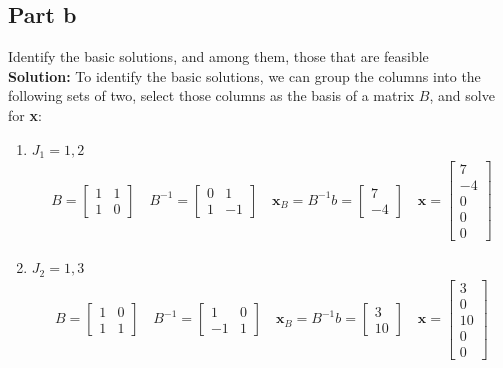 \documentclass[11pt]{article}
\begin{document}
\subsection{Part b}
Identify the basic solutions, and among them, those that are feasible
\\
\textbf{Solution: }
To identify the basic solutions, we can group the columns into the following sets of two, select those columns as the basis of a matrix $B$, and solve for \textbf{x}:
\begin{enumerate}
    \item $J_{1} = 1,2$
    \begin{align*}
      B = 
      \begin{bmatrix}
        1 & 1 \\ 1 & 0
      \end{bmatrix}
      \quad
      B^{-1} =
      \begin{bmatrix}
        0 & 1 \\ 1 & -1
      \end{bmatrix}
      \quad 
      \textbf{x}_{B} = B^{-1} b = 
      \begin{bmatrix}
        7 \\ -4
      \end{bmatrix}
      \quad
      \textbf{x} =
      \begin{bmatrix}
        7 \\ -4 \\ 0 \\ 0 \\ 0
      \end{bmatrix}
    \end{align*}
    \item $J_{2} = 1,3$
    \begin{align*}
        B = 
        \begin{bmatrix}
          1 & 0 \\ 1 & 1
        \end{bmatrix}
        \quad
        B^{-1} =
        \begin{bmatrix}
          1 & 0 \\ -1 & 1
        \end{bmatrix}
        \quad 
        \textbf{x}_{B} = B^{-1} b = 
        \begin{bmatrix}
          3 \\ 10
        \end{bmatrix}
        \quad
        \textbf{x} =
        \begin{bmatrix}
          3 \\ 0 \\ 10 \\ 0 \\ 0

\end{bmatrix}
\end{align*}
\end{enumerate}
\end{document}

